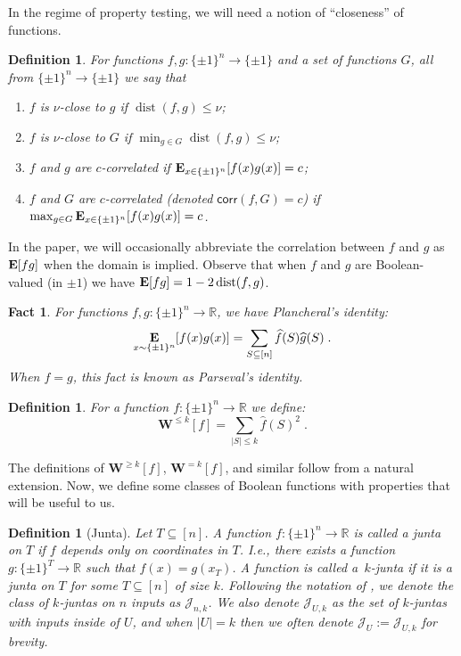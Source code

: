 \documentclass[10pt,a4paper]{article}
\theoremstyle{plain}
\newtheorem{fact}[theorem]{Fact}
\newtheorem{definition}[theorem]{Definition}
\theoremstyle{remark}
\theoremstyle{plain}
\providecommand{\R}{}
\renewcommand{\R}{\mathbb{R}}
\providecommand{\E}{}
\renewcommand{\E}{\mathop{\bf E\/}}
\providecommand{\W}{}
\renewcommand{\W}{\mathbf{W}}
\renewcommand{\hat}{\widehat}
\newcommand{\pmone}{\{\pm 1\}}
\newcommand{\calJ}{\mathcal{J}}
\newcommand{\dist}{\operatorname{dist}}
\newcommand{\Juntas}[2]{\mathcal{J}_{#1, #2}}
\newcommand{\corr}{\mathsf{corr}}
\begin{document}
In the regime of property testing, we will need a notion of ``closeness''  of functions.
\begin{definition}
For functions $f,g: \pmone^n \to \pmone$ and a set of functions $G$, all from $\pmone^n \to \pmone$ we say that
\begin{enumerate}
    \item $f$ is \emph{$\nu$-close} to $g$ if $\dist(f,g) \leq \nu$;
    \item $f$ is $\nu$-close to $G$ if $\min_{g \in G}\dist(f,g) \leq \nu$;
    \item $f$ and $g$ are $c$-correlated if $\E_{x \in \pmone^n}[f(x)g(x)]  = c$;
    \item $f$ and $G$ are $c$-correlated (denoted $\corr(f,G) = c$) if $\max_{g \in G} \E_{x \in \pmone^n}[f(x)g(x)]  = c$. 
\end{enumerate}
\end{definition}
In the paper, we will occasionally abbreviate the correlation between $f$ and $g$ as $\E[fg]$ when the domain is implied. Observe that when $f$ and $g$ are Boolean-valued (in $\pm 1$) we have $\E[fg] = 1-2\dist(f,g)$.
\begin{fact}
For functions $f,g: \pmone^n \to \R$, we have Plancheral's identity:
$$
\E_{x\sim\pmone^n}[f(x)g(x)] = \sum_{S \subseteq[n]} \hat f(S) \hat g(S)\;.
$$
When $f = g$, this fact is known as Parseval's identity.
\end{fact}
\begin{definition}
For a function $f: \pmone^n \to \R$ we define:
    $$ \W^{\leq k}[f] = \sum_{|S| \leq k} \hat f(S)^2\;.$$
\end{definition}
The definitions of $\W^{\geq k}[f]$, $\W^{=k}[f]$, and similar follow from a natural extension. Now, we define some classes of Boolean functions with properties that will be useful to us.
\begin{definition}[Junta]
Let $T\subseteq [n]$. A function $f: \pmone^n \to \R$ is called a \emph{junta} on $T$ if $f$ depends only on coordinates in $T$. I.e., there exists a function $g: \pmone^T \to \R$ such that $f(x) = g(x_T)$.
A function is called a~\emph{$k$-junta} if it is a junta on $T$ for some $T\subseteq[n]$ of size $k$. 
Following the notation of \cite{junta-coordinate-oracles}, we denote the class of $k$-juntas on $n$ inputs as $\Juntas{n}{k}$. We also denote $\Juntas{U}{k}$ as the set of $k$-juntas with inputs inside of $U$, and when $|U| = k$ then we often denote $\calJ_U:= \Juntas{U}{k}$ for brevity. 
%
%
\end{definition}
\end{document}
